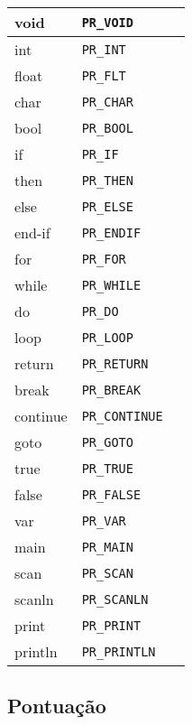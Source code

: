 \documentclass{article}
\begin{document}
	\begin{tabularx}{0.8\textwidth} { 
			| >{\raggedright\arraybackslash}X 
			| >{\centering\arraybackslash}X 
			| >{\raggedleft\arraybackslash}X | }
		\hline
		void & \texttt{PR\_VOID}  \\
		\hline
		int & \texttt{PR\_INT}  \\
		\hline
		float & \texttt{PR\_FLT}  \\
		\hline
		char & \texttt{PR\_CHAR}  \\
		\hline
		bool & \texttt{PR\_BOOL}  \\
		\hline
		if & \texttt{PR\_IF}  \\
		\hline
		then & \texttt{PR\_THEN}  \\
		\hline
		else & \texttt{PR\_ELSE}  \\
		\hline
		end-if & \texttt{PR\_ENDIF}  \\
		\hline
		for & \texttt{PR\_FOR}  \\
		\hline
		while & \texttt{PR\_WHILE}  \\
		\hline
		do & \texttt{PR\_DO}  \\
		\hline
		loop & \texttt{PR\_LOOP}  \\
		\hline
		return & \texttt{PR\_RETURN}  \\
		\hline
		break & \texttt{PR\_BREAK}  \\
		\hline
		continue & \texttt{PR\_CONTINUE}  \\
		\hline
		goto & \texttt{PR\_GOTO}  \\
		\hline
		true & \texttt{PR\_TRUE}  \\
		\hline
		false & \texttt{PR\_FALSE}  \\
		\hline
		var & \texttt{PR\_VAR}  \\
		\hline
		main & \texttt{PR\_MAIN}  \\
		\hline
		scan & \texttt{PR\_SCAN}  \\
		\hline
		scanln & \texttt{PR\_SCANLN}  \\
		\hline
		print & \texttt{PR\_PRINT}  \\
		\hline
		println & \texttt{PR\_PRINTLN}  \\
		\hline
	\end{tabularx}
	
	\subsection{Pontuação}
	
\end{document}
